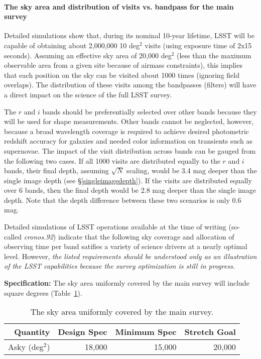 \paragraph{The sky area and distribution of visits vs. bandpass for the main survey\\}
\label{VvsB}

Detailed simulations show that, during its nominal 10-year  lifetime,
LSST will be capable of obtaining about 2,000,000 10 deg$^2$ visits
(using exposure time of 2x15 seconds).
Assuming an effective sky area of 20,000 deg$^2$ (less than the maximum
observable area from a given site because of airmass constraints), this
implies that each position on the sky can be visited about 1000 times
(ignoring field overlaps).  The distribution of these visits among the
bandpasses (filters) will have a direct impact on the science of the full
LSST survey.

The $r$ and $i$ bands should be preferentially selected over other bands
because they will be used for shape measurements. Other bands cannot
be neglected, however, because a broad wavelength coverage is required to achieve
desired photometric redshift accuracy for galaxies and needed color
information on transients such as supernovae. The impact of the visit
distribution across bands can be gauged from the following two cases. If
all 1000 visits are distributed equally to the $r$ and $i$ bands, their
final depth, assuming $\sqrt{N}$ scaling, would be 3.4 mag deeper than the
single image depth (see \S \ref{singleimagedepth}). If the visits are
distributed equally over 6 bands, then the final depth would be 2.8 mag
deeper than the single image depth. Note that the depth difference between
these two scenarios is only 0.6 mag.

Detailed simulations of LSST operations available at the time of writing
(so-called {\it cronos.92}) indicate that the following sky coverage and
allocation of observing time per band satifies a variety of science drivers at a
nearly optimal level. However, {\it the listed requirements should be
understood only as an illustration of the LSST capabilities because
the survey optimization is still in progress.}


{\bf Specification:} The sky area uniformly covered by the main
survey will include
square degrees (Table~\ref{TskyArea}).

\begin{table}[h]
\begin{tabular}{|r|r|r|r|}
\hline
 Quantity            & Design Spec & Minimum Spec & Stretch Goal     \\
\hline
 Asky  (deg$^2$)   &  18,000      &  15,000       &  20,000        \\
\hline
\end{tabular}
\caption{The sky area uniformly covered by the main survey.}
\label{TskyArea}
\end{table}

